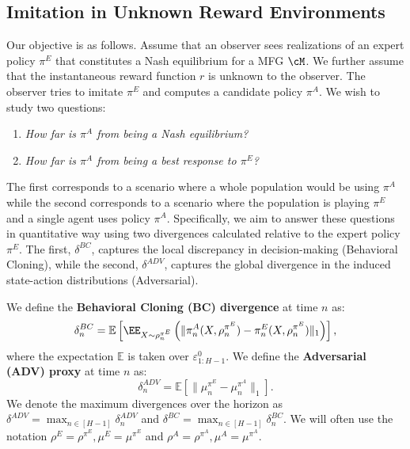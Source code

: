 \documentclass{article}
\newcommand{\defi}[1]{{\bf #1}}
\theoremstyle{plain}
\begin{document}
\subsection{Imitation in Unknown Reward Environments}
Our objective is as follows. Assume that an observer sees realizations of an expert policy $\pi^E$ that constitutes a Nash equilibrium for a MFG $\cM$. We further assume that the instantaneous reward function $r$ is unknown to the observer. The observer tries to imitate $\pi^E$ and computes a candidate policy $\pi^A$. We wish to study two questions:
\begin{enumerate}[
  label=\textbf{(Q\arabic*)},
  ref=\textbf{(Q\arabic*)}]
    \item\label{theory-q1} \textit{How far is $\pi^A$ from being a Nash equilibrium?}
    \item\label{theory-q2} \textit{How far is $\pi^A$ from being a best response to $\pi^E$?}
\end{enumerate}
The first corresponds to a scenario where a whole population would be using $\pi^A$ while the second corresponds to a scenario where the population is playing $\pi^E$ and a single agent uses policy $\pi^A$.
Specifically, we aim to answer these questions in quantitative way using two divergences calculated relative to the expert policy $\pi^E$. The first, $\delta^{BC}$, captures the local discrepancy in decision-making (Behavioral Cloning), while the second, $\delta^{ADV}$, captures the global divergence in the induced state-action distributions (Adversarial).

We define the \defi{Behavioral Cloning (BC) divergence} at time $n$ as:
\begin{equation*}
    \delta^{BC}_n = \mathbb{E} \left[ \EE_{X \sim \rho_n^{\pi^E}}\left( \| \pi^A_n( X, \rho_n^{\pi^E}) - \pi^E_n(X, \rho_n^{\pi^E})\|_1  \right)\right],
\end{equation*}
where the expectation $\mathbb{E}$ is taken over $\varepsilon^0_{1:H-1}$. 
We define the \defi{Adversarial (ADV) proxy} at time $n$ as:
\begin{equation*}
    \delta^{ADV}_n = \mathbb{E} \left[ \| \mu^{\pi^E}_n - \mu^{\pi^A}_n \|_1 \right].
\end{equation*}
We denote the maximum divergences over the horizon as $\delta^{ADV} = \max_{n \in [H-1]} \delta^{ADV}_n$ and $\delta^{BC} = \max_{n \in [H-1]} \delta^{BC}_n$. We will often use the notation $\rho^E = \rho^{\pi^E}, \mu^E = \mu^{\pi^E}$ and $\rho^A = \rho^{\pi^A}, \mu^A = \mu^{\pi^A}$.
\end{document}
